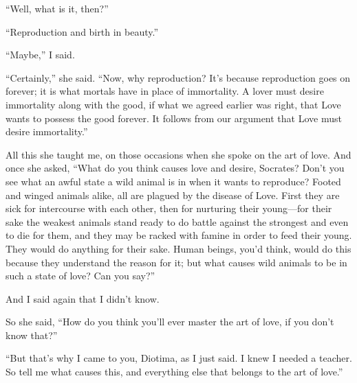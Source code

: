 “Well, what is it, then?”

“Reproduction and birth in beauty.”

“Maybe,” I said.

“Certainly,” she said. “Now, why reproduction? It’s because reproduction
 goes on forever; it is what mortals have in place of
immortality. A lover must desire immortality along with the good, if
what we agreed earlier was right, that Love wants to possess the good
forever. It follows from our argument that Love must desire
immortality.”

All this she taught me, on those occasions when she spoke on the art of
love. And once she asked, “What do you think causes love and desire,
Socrates? Don’t you see what an awful state a wild animal is in when it
 wants to reproduce? Footed and winged animals alike, all are
plagued by the disease of Love. First they are sick for intercourse with
each other, then for nurturing their young---for their sake the weakest
animals stand ready to do battle against the strongest and even to die
for them, and they may be racked with famine in order to feed their
young. They would do anything for their sake. Human beings, you’d think,
would do this because  they understand the reason for it; but
what causes wild animals to be in such a state of love? Can you say?”

And I said again that I didn’t know.

So she said, “How do you think you’ll ever master the art of love, if
you don’t know that?”

“But that’s why I came to you, Diotima, as I just said. I knew I needed
a teacher. So tell me what causes this, and everything else that belongs
to the art of love.”

